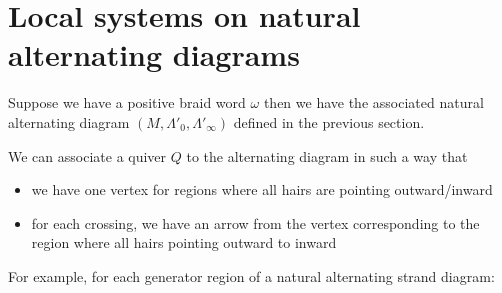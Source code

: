 \section{Local systems on natural alternating diagrams}

Suppose we have a positive braid word $\omega$ then we have the associated natural alternating diagram $(M, \Lambda'_0, \Lambda'_\infty)$ defined in the previous section.

We can associate a quiver $Q$ to the alternating diagram in such a way that

\begin{itemize}
\item we have one vertex for regions where all hairs are pointing outward/inward
\item for each crossing, we have an arrow from the vertex corresponding to the region where all hairs pointing outward to inward
\end{itemize}

For example, for each generator region of a natural alternating strand diagram:

